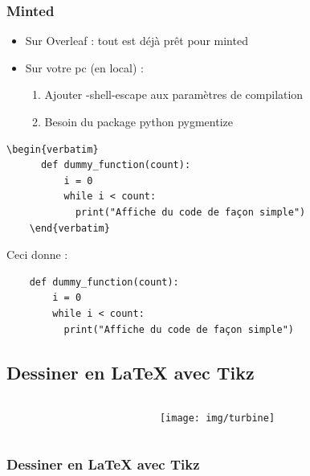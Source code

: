 \begin{frame}[fragile]
  \frametitle{Minted}

  \begin{itemize}
    \item Sur Overleaf : tout est déjà prêt pour minted
    \item Sur votre pc (en local) :
    \begin{enumerate}
      \item Ajouter -shell-escape aux paramètres de compilation
      \item Besoin du package python pygmentize
    \end{enumerate}
  \end{itemize}

  \begin{lstlisting}[mathescape=true]
    \begin{verbatim}
      def dummy_function(count):
          i = 0
          while i < count:
            print("Affiche du code de façon simple")
    \end{verbatim}\end{lstlisting}

  Ceci donne :

  \begin{verbatim}
    def dummy_function(count):
        i = 0
        while i < count:
          print("Affiche du code de façon simple")
  \end{verbatim}
\end{frame}

\subsection{Dessiner en LaTeX avec Tikz}

\begin{frame}[fragile]
  \begin{columns}
    \begin{column}{0.45\textwidth}
    \end{column}
    \begin{column}{0.45\textwidth}
      \begin{figure}[!ht] \centering
        \texttt{[image: img/turbine]} %
      \end{figure}
    \end{column}
  \end{columns}
  \frametitle{Dessiner en LaTeX avec Tikz}
\end{frame}

